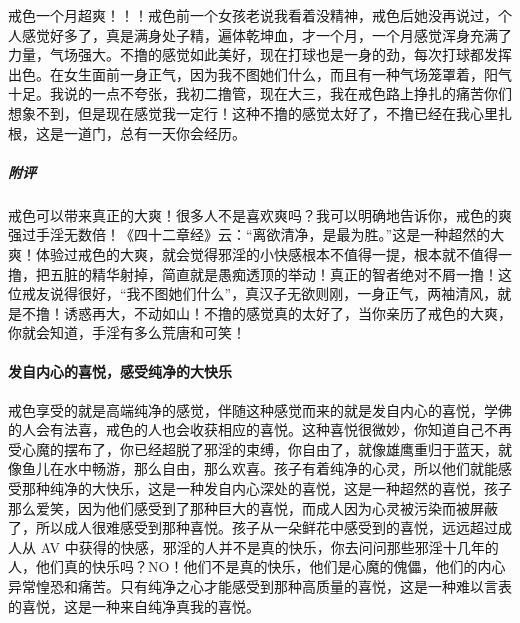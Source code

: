 \begin{case}
    戒色一个月超爽！！！戒色前一个女孩老说我看着没精神，戒色后她没再说过，个人感觉好多了，真是满身处子精，遍体乾坤血，才一个月，一个月感觉浑身充满了力量，气场强大。不撸的感觉如此美好，现在打球也是一身的劲，每次打球都发挥出色。在女生面前一身正气，因为我不图她们什么，而且有一种气场笼罩着，阳气十足。我说的一点不夸张，我初二撸管，现在大三，我在戒色路上挣扎的痛苦你们想象不到，但是现在感觉我一定行！这种不撸的感觉太好了，不撸已经在我心里扎根，这是一道门，总有一天你会经历。
    \subparagraph{附评} 戒色可以带来真正的大爽！很多人不是喜欢爽吗？我可以明确地告诉你，戒色的爽强过手淫无数倍！《四十二章经》云：“离欲清净，是最为胜。”这是一种超然的大爽！体验过戒色的大爽，就会觉得邪淫的小快感根本不值得一提，根本就不值得一撸，把五脏的精华射掉，简直就是愚痴透顶的举动！真正的智者绝对不屑一撸！这位戒友说得很好，“我不图她们什么”，真汉子无欲则刚，一身正气，两袖清风，就是不撸！诱惑再大，不动如山！不撸的感觉真的太好了，当你亲历了戒色的大爽，你就会知道，手淫有多么荒唐和可笑！
\end{case}

\paragraph{发自内心的喜悦，感受纯净的大快乐}

戒色享受的就是高端纯净的感觉，伴随这种感觉而来的就是发自内心的喜悦，学佛的人会有法喜，戒色的人也会收获相应的喜悦。这种喜悦很微妙，你知道自己不再受心魔的摆布了，你已经超脱了邪淫的束缚，你自由了，就像雄鹰重归于蓝天，就像鱼儿在水中畅游，那么自由，那么欢喜。孩子有着纯净的心灵，所以他们就能感受那种纯净的大快乐，这是一种发自内心深处的喜悦，这是一种超然的喜悦，孩子那么爱笑，因为他们感受到了那种巨大的喜悦，而成人因为心灵被污染而被屏蔽了，所以成人很难感受到那种喜悦。孩子从一朵鲜花中感受到的喜悦，远远超过成人从 AV 中获得的快感，邪淫的人并不是真的快乐，你去问问那些邪淫十几年的人，他们真的快乐吗？NO！他们不是真的快乐，他们是心魔的傀儡，他们的内心异常惶恐和痛苦。只有纯净之心才能感受到那种高质量的喜悦，这是一种难以言表的喜悦，这是一种来自纯净真我的喜悦。

